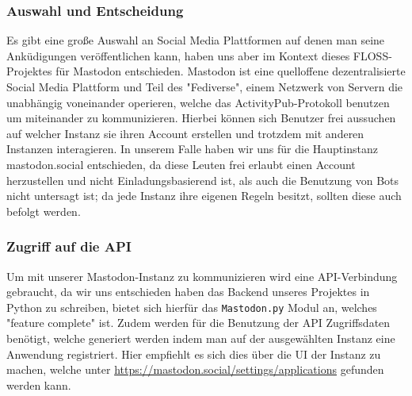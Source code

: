 \documentclass{article}
\begin{document}
\subsubsection{Auswahl und Entscheidung}
Es gibt eine große Auswahl an Social Media Plattformen auf denen man seine Anküdigungen veröffentlichen kann, haben uns aber im Kontext dieses FLOSS-Projektes für Mastodon entschieden. Mastodon ist eine quelloffene dezentralisierte Social Media Plattform und Teil des "Fediverse", einem Netzwerk von Servern die unabhängig voneinander operieren, welche das ActivityPub-Protokoll benutzen um miteinander zu kommunizieren. Hierbei können sich Benutzer frei aussuchen auf welcher Instanz sie ihren Account erstellen und trotzdem mit anderen Instanzen interagieren. In unserem Falle haben wir uns für die Hauptinstanz mastodon.social entschieden, da diese Leuten frei erlaubt einen Account herzustellen und nicht Einladungsbasierend ist, als auch die Benutzung von Bots nicht untersagt ist; da jede Instanz ihre eigenen Regeln besitzt, sollten diese auch befolgt werden.

\subsubsection{Zugriff auf die API}
Um mit unserer Mastodon-Instanz zu kommunizieren wird eine API-Verbindung gebraucht, da wir uns entschieden haben das Backend unseres Projektes in Python zu schreiben, bietet sich hierfür das \texttt{Mastodon.py} Modul an, welches "feature complete" ist. Zudem werden für die Benutzung der API Zugriffsdaten benötigt, welche generiert werden indem man auf der ausgewählten Instanz eine Anwendung registriert. Hier empfiehlt es sich dies über die UI der Instanz zu machen, welche unter \url{https://mastodon.social/settings/applications} gefunden werden kann.
\end{document}

